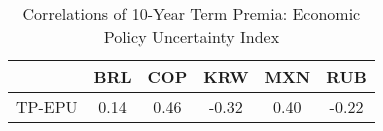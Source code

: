 \begin{tiny}\begin{table}
		\centering
		\begin{tabular}{l|ccccc}
			\toprule
			 & BRL & COP & KRW & MXN & RUB \\
			 \midrule 
			 TP-EPU & 0.14 & 0.46 & -0.32 & 0.40 & -0.22 \\
			 \bottomrule
		 \end{tabular}
	 \caption{Correlations of 10-Year Term Premia: Economic Policy Uncertainty Index}\label{tab:temp_tp_corr10yr_epu}\end{table}\end{tiny}